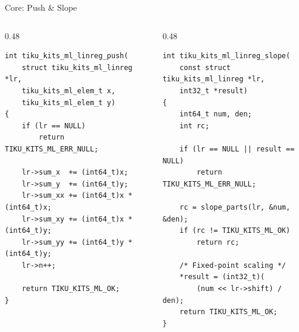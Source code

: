\documentclass[aspectratio=169, 10pt]{beamer}
\begin{document}
\begin{frame}[fragile]{Core: Push \& Slope}
\begin{columns}[T]
\begin{column}{0.48\textwidth}
\begin{lstlisting}[style=cstyle,
  title={tiku\_kits\_ml\_linreg.c --- push}]
int tiku_kits_ml_linreg_push(
    struct tiku_kits_ml_linreg *lr,
    tiku_kits_ml_elem_t x,
    tiku_kits_ml_elem_t y)
{
    if (lr == NULL)
        return TIKU_KITS_ML_ERR_NULL;

    lr->sum_x  += (int64_t)x;
    lr->sum_y  += (int64_t)y;
    lr->sum_xx += (int64_t)x * (int64_t)x;
    lr->sum_xy += (int64_t)x * (int64_t)y;
    lr->sum_yy += (int64_t)y * (int64_t)y;
    lr->n++;

    return TIKU_KITS_ML_OK;
}
\end{lstlisting}
\end{column}

\begin{column}{0.48\textwidth}
\begin{lstlisting}[style=cstyle,
  title={tiku\_kits\_ml\_linreg.c --- slope}]
int tiku_kits_ml_linreg_slope(
    const struct tiku_kits_ml_linreg *lr,
    int32_t *result)
{
    int64_t num, den;
    int rc;

    if (lr == NULL || result == NULL)
        return TIKU_KITS_ML_ERR_NULL;

    rc = slope_parts(lr, &num, &den);
    if (rc != TIKU_KITS_ML_OK)
        return rc;

    /* Fixed-point scaling */
    *result = (int32_t)(
        (num << lr->shift) / den);
    return TIKU_KITS_ML_OK;
}
\end{lstlisting}
\end{column}
\end{columns}
\end{frame}
\end{document}

